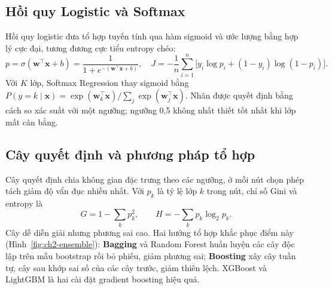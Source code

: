 
\subsection{Hồi quy Logistic và Softmax}
Hồi quy logistic \cite{ch2:cox1958} đưa tổ hợp tuyến tính qua hàm sigmoid và ước lượng bằng hợp lý cực đại, tương đương cực tiểu entropy chéo:
\begin{equation}
  p=\sigma(\mathbf{w}^\top\mathbf{x}+b)=\frac{1}{1+e^{-(\mathbf{w}^\top\mathbf{x}+b)}},\quad
  J=-\frac1n\sum_{i=1}^n\big[y_i\log p_i+(1-y_i)\log(1-p_i)\big].
\end{equation}
Với $K$ lớp, Softmax Regression thay sigmoid bằng
$P(y=k\mid\mathbf{x})=\exp(\mathbf{w}_k^\top\mathbf{x})/\sum_{j}\exp(\mathbf{w}_j^\top\mathbf{x})$. Nhãn được quyết định bằng cách so xác suất với một
ngưỡng; ngưỡng 0,5 không nhất thiết tốt nhất khi lớp mất cân bằng.

\subsection{Cây quyết định và phương pháp tổ hợp}
Cây quyết định \cite{ch2:breiman1984,ch2:quinlan1986} chia không gian đặc trưng theo các ngưỡng, ở mỗi nút chọn phép tách giảm độ vẩn đục nhiều nhất.
Với $p_k$ là tỷ lệ lớp $k$ trong nút, chỉ số Gini và entropy là
\begin{equation}
  G=1-\sum_{k}p_k^2,\qquad H=-\sum_{k}p_k\log_2 p_k.
\end{equation}
Cây dễ diễn giải nhưng phương sai cao. Hai hướng tổ hợp khắc phục điểm này (Hình~\ref{fig:ch2-ensemble}): \textbf{Bagging} và Random Forest
\cite{ch2:breiman1996,ch2:breiman2001} huấn luyện các cây độc lập trên mẫu bootstrap rồi bỏ phiếu, giảm phương sai;
\textbf{Boosting} \cite{ch2:friedman2001} xây cây tuần tự, cây sau khớp sai số của các cây trước, giảm thiên lệch. XGBoost \cite{ch2:chen2016} và
LightGBM \cite{ch2:ke2017} là hai cài đặt gradient boosting hiệu quả.



